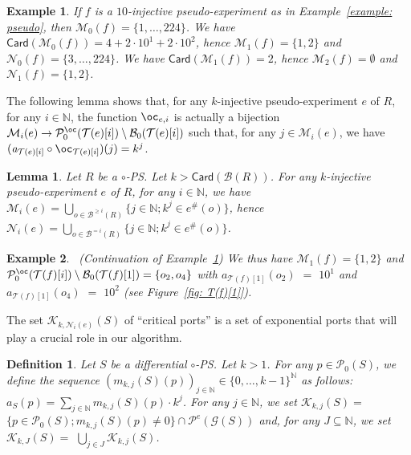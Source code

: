 \documentclass{article}
\theoremstyle{plain}
\newtheorem{definition}{Definition}
\newtheorem{example}{Example}
\newtheorem{lem}[theorem]{Lemma}
\newcommand{\Nat}{\ensuremath{\mathbb{N}}}
\newcommand{\taylor}[2]{\mathcal{T}(#1)[#2]}
\newcommand{\criticalports}[3]{\mathcal{K}_{#2, #3}(#1)}
\newcommand{\groundof}[1]{\mathcal{G}(#1)}
\newcommand{\cod}{\oc}
\newcommand{\portsatzero}[1]{\mathcal{P}_0(#1)}
\newcommand{\arity}[1]{{\textit{a}}_{#1}}
\newcommand{\Card}[1]{\textsf{Card}\left( #1 \right)}
\newcommand{\portsatzerooftype}[2]{\mathcal{P}_0^{#1}(#2)}
\newcommand{\boxes}[1]{\mathcal{B}(#1)}
\newcommand{\boxesatzero}[1]{\mathcal{B}_{0}(#1)}
\newcommand{\exactboxes}[2]{\mathcal{B}^{=#2}(#1)}
\newcommand{\boxesgeq}[2]{\mathcal{B}^{\geq #2}(#1)}
\newcommand{\exponentialports}[1]{\mathcal{P}^{\textit{e}}(#1)}
\begin{document}
\begin{example}\label{example: N_i(e)}
If $f$ is a $10$-injective pseudo-experiment as in Example~\ref{example: pseudo}, then $\mathcal{M}_0(f) = \{ 1, \ldots, 224 \}$. We have $\Card{\mathcal{M}_0(f)} = 4 + 2 \cdot 10^1 + 2 \cdot 10^2$, hence $\mathcal{M}_1(f) = \{ 1, 2 \}$ and $\mathcal{N}_0(f) = \{ 3, \ldots, 224 \}$. We have $\Card{\mathcal{M}_1(f)} = 2$, hence $\mathcal{M}_2(f) = \emptyset$ and $\mathcal{N}_1(f) = \{ 1, 2 \}$.  
\end{example}


The following lemma shows that, for any $k$-injective pseudo-experiment $e$ of $R$, for any $i \in \Nat$, the function $\cod_{e, i}$ is actually a bijection $\mathcal{M}_i(e) \to \portsatzerooftype{\cod}{\taylor{e}{i}} \setminus \boxesatzero{\taylor{e}{i}}$ such that, for any $j \in \mathcal{M}_i(e)$,  we have  $(\arity{\taylor{e}{i}} \circ \cod_{\taylor{e}{i}})(j) = k^j$. 

\begin{lem}\label{lem: M_i}
Let $R$ be a $\circ$-PS. 
Let $k > \Card{\boxes{R}{}}$. 
For any $k$-injective pseudo-experiment $e$ of $R$, for any $i \in \Nat$, we have $\mathcal{M}_i(e) = \bigcup_{o \in \boxesgeq{R}{i}} \{ j \in \Nat ; k^j \in e^\#(o) \}$, hence $\mathcal{N}_i(e) = \bigcup_{o \in \exactboxes{R}{i}} \{ j \in \Nat ; k^j \in e^\#(o) \}$.
\end{lem}

\begin{example}~\label{example: N_i(e) - 2}
(Continuation of Example~\ref{example: N_i(e)}) We thus have $\mathcal{M}_1(f) = \{ 1, 2 \}$ and $\portsatzerooftype{\cod}{\taylor{f}{i}} \setminus \boxesatzero{\taylor{f}{1}} = \{ o_2, o_4 \}$ with $\arity{\taylor{f}{1}}(o_2)$ $=$ $10^1$ and $\arity{\taylor{f}{1}}(o_4)$ $=$ $10^2$ (see Figure~\ref{fig: T(f)[1]}).
\end{example}

The set $\criticalports{S}{k}{\mathcal{N}_i(e)}$ of ``critical ports'' is a set of exponential ports that will play a crucial role in our algorithm.



\begin{definition}\label{definition: critical}
Let $S$ be a differential $\circ$-PS. Let $ k > 1$. For any $p \in \portsatzero{S}$, we define the sequence $(m_{k, j}(S)(p))_{j \in \Nat} \in \{ 0, \ldots, k-1 \}^{\Nat}$ as follows: $\arity{S}(p) = \sum_{j \in \Nat} m_{k, j}(S)(p) \cdot k^j$. For any $j \in \Nat$, we set $\criticalports{S}{k}{j} = $ $\{ p \in \portsatzero{S} ; m_{k, j}(S)(p) \not= 0 \} \cap \exponentialports{\groundof{S}}$ and, for any $J \subseteq \Nat$, we set $\criticalports{S}{k}{J} =$  $\bigcup_{j \in J} \criticalports{S}{k}{j}$. 
\end{definition}
\end{document}
